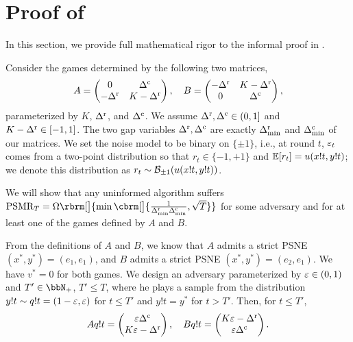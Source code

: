 \section{Proof of }\label{h1a:proof-lower-bound}

In this section, we provide full mathematical rigor to the informal proof in .

Consider the games determined by the following two matrices,
\begin{equation*}
    A=\begin{pmatrix}
        0 &        \Delta^{\mathrm{c}} \\ 
        -\Delta^{\mathrm{r}} & K - \Delta^{\mathrm{r}} 
      \end{pmatrix},
    \quad 
    B=\begin{pmatrix}
        -\Delta^{\mathrm{r}} & K - \Delta^{\mathrm{r}} \\
        0 &        \Delta^{\mathrm{c}} \\ 
      \end{pmatrix},
\end{equation*}
parameterized by $K$, $\Delta^{\mathrm{r}}$, and $\Delta^{\mathrm{c}}$. We assume $\Delta^{\mathrm{r}}, \Delta^{\mathrm{c}} \in (0, 1]$ and $K-\Delta^{\mathrm{r}}\in [-1, 1]$. The two gap variables $\Delta^{\mathrm{r}},\Delta^{\mathrm{c}}$ are exactly $\Delta^{\mathrm{r}}_{\mathrm{min}}$ and $\Delta^{\mathrm{c}}_{\mathrm{min}}$ of our matrices. We set the noise model to be binary on $\{\pm 1\}$, i.e., at round $t$, $\varepsilon_t$ comes from a two-point distribution so that $r_t\in \{-1,+1\}$ and $\mathbb{E}[r_t]=u(x!t,y!t)$; we denote this distribution as $r_t\sim \mathcal{B}_{\pm 1}(u(x!t,y!t))$.

We will show that any uninformed algorithm suffers $\psmr_T = \Omega\rbrm[\big]{\min\cbrm[\big]{\frac{1}{\DRmin\DCmin},\sqrt{T}}}$ for some adversary and for at least one of the games defined by $A$ and $B$.

From the definitions of $A$ and $B$, we know that $A$ admits a strict PSNE $(x^*,y^*)=(e_1,e_1)$, and $B$ admits a strict PSNE $(x^*,y^*)=(e_2,e_1)$. We have $v^*=0$ for both games. We design an adversary parameterized by $\varepsilon\in (0,1)$ and $T'\in \bbN_+$, $T'\leq T$, where he plays a sample from the distribution $y!t\sim q!t=(1-\varepsilon,\varepsilon)$ for $t\leq T'$ and $y!t=y^*$ for $t>T'$. Then, for $t\leq T'$,
\begin{equation*}
    A q!t = \begin{pmatrix}
        \varepsilon \Delta^{\mathrm{c}}\\
        K \varepsilon - \Delta^{\mathrm{r}}
    \end{pmatrix},
    \quad
    B q!t = \begin{pmatrix}
        K \varepsilon - \Delta^{\mathrm{r}}\\
        \varepsilon \Delta^{\mathrm{c}}
    \end{pmatrix}.
\end{equation*}

